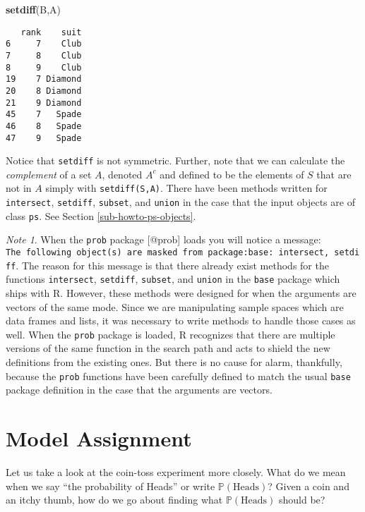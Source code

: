 \documentclass[]{book}
\newenvironment{Shaded}{\begin{snugshade}}{\end{snugshade}}
\newcommand{\KeywordTok}[1]{\textcolor[rgb]{0.13,0.29,0.53}{\textbf{{#1}}}}
\newcommand{\NormalTok}[1]{{#1}}
\numberwithin{equation}{chapter}
\numberwithin{figure}{chapter}
\theoremstyle{plain}
\theoremstyle{definition}
\theoremstyle{remark}
\newtheorem{note}[thm]{Note}
\theoremstyle{definition}
\theoremstyle{definition}
\theoremstyle{remark}
\begin{document}
\begin{Shaded}
\begin{Highlighting}[]
\KeywordTok{setdiff}\NormalTok{(B,A) }
\end{Highlighting}
\end{Shaded}

\begin{verbatim}
   rank    suit
6     7    Club
7     8    Club
8     9    Club
19    7 Diamond
20    8 Diamond
21    9 Diamond
45    7   Spade
46    8   Spade
47    9   Spade
\end{verbatim}

Notice that \texttt{setdiff} is not symmetric. Further, note that we can
calculate the \emph{complement} of a set \(A\), denoted \(A^{c}\) and
defined to be the elements of \(S\) that are not in \(A\) simply with
\texttt{setdiff(S,A)}. There have been methods written for
\texttt{intersect}, \texttt{setdiff}, \texttt{subset}, and
\texttt{union} in the case that the input objects are of class
\texttt{ps}. See Section \ref{sub-howto-ps-objects}.

\bigskip

\begin{note}
When the \texttt{prob} package {[}@prob{]} loads you will notice a
message:
\texttt{The\ following\ object(s)\ are\ masked\ from\ package:base:\ intersect,\ setdiff}.
The reason for this message is that there already exist methods for the
functions \texttt{intersect}, \texttt{setdiff}, \texttt{subset}, and
\texttt{union} in the \texttt{base} package which ships with R. However,
these methods were designed for when the arguments are vectors of the
same mode. Since we are manipulating sample spaces which are data frames
and lists, it was necessary to write methods to handle those cases as
well. When the \texttt{prob} package is loaded, R recognizes that there
are multiple versions of the same function in the search path and acts
to shield the new definitions from the existing ones. But there is no
cause for alarm, thankfully, because the \texttt{prob} functions have
been carefully defined to match the usual \texttt{base} package
definition in the case that the arguments are vectors.
\end{note}

\section{Model Assignment}\label{sec-interpreting-probabilities}

Let us take a look at the coin-toss experiment more closely. What do we
mean when we say ``the probability of Heads'' or write
\(\mathbb{P}(\mbox{Heads})\)? Given a coin and an itchy thumb, how do we
go about finding what \(\mathbb{P}(\mbox{Heads})\) should be?
\end{document}
